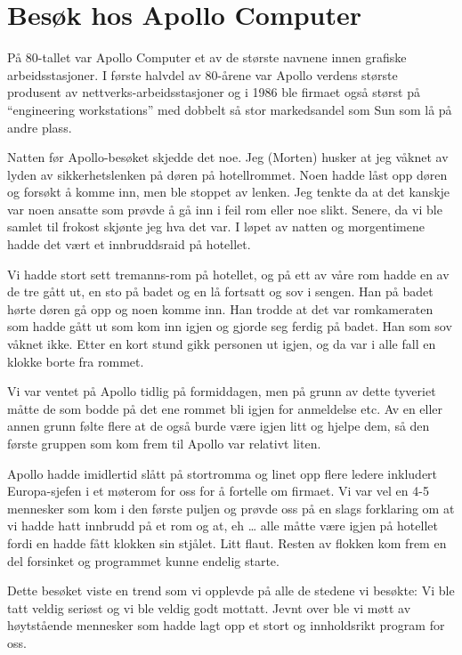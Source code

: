 \documentclass[../../main.tex]{subfiles}
\begin{document}
\section{Besøk hos Apollo Computer}

På 80-tallet var Apollo Computer et av de største navnene innen grafiske arbeidsstasjoner. I første halvdel av 80-årene var Apollo verdens største produsent av nettverks-arbeidsstasjoner og i 1986 ble firmaet også størst på “engineering workstations” med dobbelt så stor markedsandel som Sun som lå på andre plass. 

Natten før Apollo-besøket skjedde det noe. Jeg (Morten) husker at jeg våknet av lyden av sikkerhetslenken på døren på hotellrommet. Noen hadde låst opp døren og forsøkt å komme inn, men ble stoppet av lenken. Jeg tenkte da at det kanskje var noen ansatte som prøvde å gå inn i feil rom eller noe slikt. Senere, da vi ble samlet til frokost skjønte jeg hva det var. I løpet av natten og morgentimene hadde det vært et innbruddsraid på hotellet.

Vi hadde stort sett tremanns-rom på hotellet, og på ett av våre rom hadde en av de tre gått ut, en sto på badet og en lå fortsatt og sov i sengen. Han på badet hørte døren gå opp og noen komme inn. Han trodde at det var romkameraten som hadde gått ut som kom inn igjen og gjorde seg ferdig på badet. Han som sov våknet ikke. Etter en kort stund gikk personen ut igjen, og da var i alle fall en klokke borte fra rommet.

Vi var ventet på Apollo tidlig på formiddagen, men på grunn av dette tyveriet måtte de som bodde på det ene rommet bli igjen for anmeldelse etc. Av en eller annen grunn følte flere at de også burde være igjen litt og hjelpe dem, så den første gruppen som kom frem til Apollo var relativt liten. 

Apollo hadde imidlertid slått på stortromma og linet opp flere ledere inkludert Europa-sjefen i et møterom for oss for å fortelle om firmaet. Vi var vel en 4-5 mennesker som kom i den første puljen og prøvde oss på en slags forklaring om at vi hadde hatt innbrudd på et rom og at, eh … alle måtte være igjen på hotellet fordi en hadde fått klokken sin stjålet. Litt flaut. Resten av flokken kom frem en del forsinket og programmet kunne endelig starte.

Dette besøket viste en trend som vi opplevde på alle de stedene vi besøkte: Vi ble tatt veldig seriøst og vi ble veldig godt mottatt. Jevnt over ble vi møtt av høytstående mennesker som hadde lagt opp et stort og innholdsrikt program for oss. 
\end{document}

